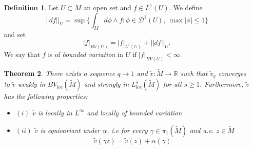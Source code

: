 \documentclass{ip-journal}
\newtheorem{theorem}{Theorem}[section]
\theoremstyle{definition}
\newtheorem{definition}[theorem]{Definition}
\numberwithin{equation}{section}
\newcommand{\R}{\mathbb R}
\begin{document}
\begin{definition}\label{def:bdvar} Let $U \subset M$ an open set and $f \in L^1(U)$. We define
\[
||df||_U=\sup\{ \int_M d\phi  \wedge f: \phi \in \mathcal D^1(U), \ \max|\phi| \leq 1 \} 
\]
 and set
\[
|f|_{BV(U)}= |f|_{L^1(U)}+||df||_U.
\]
We say that $f$ is of {\it{bounded variation}} in $U$ if $|f|_{BV(U)} < \infty$. 
\end{definition}



\begin{theorem} \label{lemma:limmeasures2} There exists a sequence  $q \rightarrow 1$  and $ \tilde v:  \tilde M \rightarrow  \R$ such that $\tilde v_q$ converges to $\tilde v$ {\it weakly} in $BV_{loc}(\tilde M)$ and {\it strongly} in $L^s_{loc}(\tilde M)$ for all $s \geq 1$.
Furthermore, $\tilde v$ has the following properties:
\begin{itemize}
\item $(i)$ $\tilde v$ is locally in $L^\infty$ and locally of bounded variation
\item $(ii)$ $\tilde v$ is equivariant under $\alpha$, i.e for every $ \gamma \in \pi_1(\tilde M)$ and a.e. $ z \in \tilde M$
  \[
  \tilde v(\gamma z)=\tilde v(z)+ \alpha(\gamma)
  \]
\end{itemize} 

\end{theorem}
\end{document}

